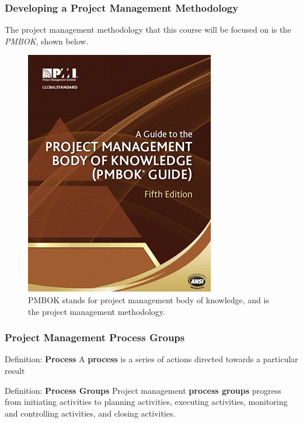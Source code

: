 \documentclass[aspectratio=169]{beamer}
\begin{document}
\begin{frame}
\frametitle{Developing a Project Management Methodology}
The project management methodology that this course will be focused on is the \textit{PMBOK}, shown below.
\begin{figure}
\includegraphics[scale=0.3]{pmbok_guide}
\caption{PMBOK stands for project management body of knowledge, and is the project management methodology.}
\end{figure}
\end{frame}

\begin{frame}
\frametitle{Project Management Process Groups}
\begin{block}{Definition: \textbf{Process}}
A \textbf{process} is a series of actions directed towards a particular result
\end{block}
\vspace{0.5cm}
\begin{block}{Definition: \textbf{Process Groups}}
Project management \textbf{process groups} progress from initiating activities to planning activities, executing activities, monitoring and controlling activities, and closing activities.
\end{block}

\end{frame}

\end{document}
